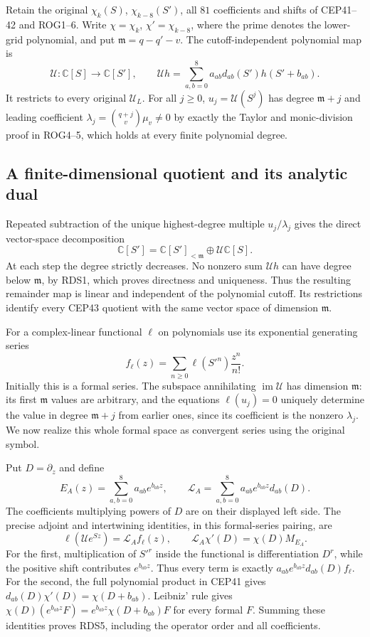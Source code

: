 \documentclass[11pt,a4paper]{article}
\begin{document}
Retain the original $\chi_k(S)$, $\chi_{k-8}(S')$, all $81$
coefficients and shifts of CEP41--42 and ROG1--6. Write
$\chi=\chi_k$, $\chi'=\chi_{k-8}$, where the prime denotes
the lower-grid polynomial, and put $\mathfrak m=q-q'-v$.
The cutoff-independent polynomial map is
\[
 \mathcal U:\mathbb C[S]\longrightarrow\mathbb C[S'],\qquad
 \mathcal Uh=\sum_{a,b=0}^8a_{ab}d_{ab}(S')h(S'+b_{ab}).
 \tag{RDS1}
\]
It restricts to every original $\mathcal U_L$. For all $j\ge0$,
$u_j=\mathcal U(S^j)$ has degree $\mathfrak m+j$ and leading
coefficient $\lambda_j=\binom{q+j}{v}\mu_v\ne0$ by exactly
the Taylor and monic-division proof in ROG4--5, which holds at
every finite polynomial degree.

\subsection{A finite-dimensional quotient and its analytic dual}

Repeated subtraction of the unique highest-degree multiple
$u_j/\lambda_j$ gives the direct vector-space decomposition
\[
 \mathbb C[S']=\mathbb C[S']_{<\mathfrak m}
                         \oplus\mathcal U\mathbb C[S].
 \tag{RDS2}
\]
At each step the degree strictly decreases. No nonzero sum
$\mathcal Uh$ can have degree below $\mathfrak m$, by RDS1,
which proves directness and uniqueness. Thus the resulting
remainder map is linear and independent of the polynomial
cutoff. Its restrictions identify every CEP43 quotient with
the same vector space of dimension $\mathfrak m$.

For a complex-linear functional $\ell$ on polynomials use its
exponential generating series
\[
 f_\ell(z)=\sum_{n\ge0}\ell(S'^n)\frac{z^n}{n!}.
 \tag{RDS3}
\]
Initially this is a formal series. The subspace annihilating
$\operatorname{im}\mathcal U$ has dimension $\mathfrak m$:
its first $\mathfrak m$ values are arbitrary, and the equations
$\ell(u_j)=0$ uniquely determine the value in degree
$\mathfrak m+j$ from earlier ones, since its coefficient is
the nonzero $\lambda_j$. We now realize this whole formal
space as convergent series using the original symbol.

Put $D=\partial_z$ and define
\[
 E_A(z)=\sum_{a,b=0}^8a_{ab}e^{b_{ab}z},\qquad
 \mathscr L_A=\sum_{a,b=0}^8a_{ab}e^{b_{ab}z}d_{ab}(D).
 \tag{RDS4}
\]
The coefficients multiplying powers of $D$ are on their
displayed left side. The precise adjoint and intertwining
identities, in this formal-series pairing, are
\[
 \ell(\mathcal U e^{Sz})=\mathscr L_Af_\ell(z),\qquad
 \mathscr L_A\chi'(D)=\chi(D)M_{E_A}.
 \tag{RDS5}
\]
For the first, multiplication of $S'^r$ inside the functional
is differentiation $D^r$, while the positive shift contributes
$e^{b_{ab}z}$. Thus every term is exactly
$a_{ab}e^{b_{ab}z}d_{ab}(D)f_\ell$.
For the second, the full polynomial product in CEP41 gives
$d_{ab}(D)\chi'(D)=\chi(D+b_{ab})$. Leibniz' rule gives
$\chi(D)(e^{b_{ab}z}F)=e^{b_{ab}z}\chi(D+b_{ab})F$
for every formal $F$. Summing these identities proves RDS5,
including the operator order and all coefficients.
\end{document}
